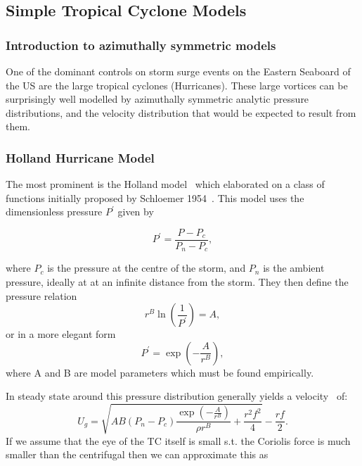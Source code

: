 \subsection{Simple Tropical Cyclone Models}

\subsubsection{Introduction to azimuthally symmetric models}
One of the dominant controls on storm surge events on the Eastern Seaboard
 of the US are the large tropical cyclones (Hurricanes).
  These large vortices can be surprisingly well modelled by azimuthally
   symmetric analytic pressure distributions, and the velocity distribution
    that would be expected to result from them.

\subsubsection{Holland Hurricane Model}
The most prominent is the  Holland model~\cite{holland1980analytic,holland2010revised}
 which elaborated on a class of functions initially proposed
 by Schloemer 1954~\cite{schloemer1954analysis}.
  This model uses the dimensionless pressure \( P^{\prime}\) given by

\begin{equation}
    P^{\prime}=\dfrac{P-P_{c}}{P_{n}-P_{c}},
\end{equation}

where $P_c$ is the pressure at the centre of the storm, and $P_n$ is
the ambient pressure, ideally at at an infinite distance from the storm.
They then define the pressure relation
\begin{equation}
    r^{B}\ln(\frac{1}{P^{\prime}})=A,
\end{equation}or in a more elegant form
\begin{equation}
P^{\prime}=\exp{(-\frac{A}{r^B})},
\end{equation}
where A and B are model parameters
which must be found empirically.

In steady state around this  pressure distribution generally yields a
 velocity~\cite{roisin2010GFD} of:
\begin{equation}
    U_g = \sqrt{AB(P_{n} - P_{c})\frac{\exp{(-\frac{A}{r^{B}})}}{\rho r^{B}}
     +\frac{r^2f^2}{4}}-\frac{rf}{2}.
\end{equation}
If we assume that the eye of the TC itself is small s.t. the Coriolis force
 is much smaller than the centrifugal then we can approximate this as

